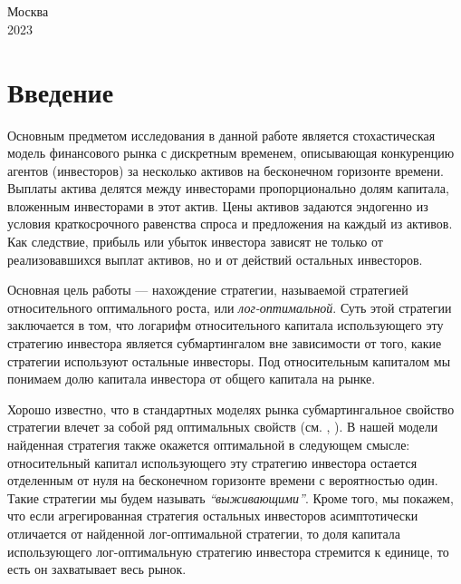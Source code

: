 \documentclass[a4paper,12pt,russian]{article} %
\theoremstyle{definition}
\begin{document}
    \hfill \break \\
    \hfill \\
    \hfill
    
\begin{center}
    Москва\\
    2023
\end{center}
    \thispagestyle{empty} %
    
    \tableofcontents
    
    \newpage
    
\section{Введение}
Основным предметом исследования в данной работе является стохастическая модель финансового рынка с дискретным временем, описывающая конкуренцию агентов (инвесторов) за несколько активов на бесконечном горизонте времени. Выплаты актива делятся между инвесторами пропорционально долям капитала, вложенным инвесторами в этот актив. Цены активов задаются эндогенно из условия краткосрочного равенства спроса и предложения на каждый из активов. Как следствие, прибыль или убыток инвестора зависят не только от реализовавшихся выплат активов, но и от действий остальных инвесторов.

Основная цель работы — нахождение стратегии, называемой стратегией относительного оптимального роста, или \textit{лог-оптимальной}. Суть этой стратегии заключается в том, что логарифм относительного капитала использующего эту стратегию инвестора является субмартингалом вне зависимости от того, какие стратегии используют остальные инвесторы. Под относительным капиталом мы понимаем долю капитала инвестора от общего капитала на рынке.

Хорошо известно, что в стандартных моделях рынка  субмартингальное свойство стратегии влечет за собой ряд оптимальных свойств (см. \cite{AlgoetCover1988}, \cite{KaratzasKardaras2007}). В нашей модели найденная стратегия также окажется оптимальной в следующем смысле: относительный капитал использующего эту стратегию инвестора остается отделенным от нуля на бесконечном горизонте времени с вероятностью один. Такие стратегии мы будем называть \textit{``выживающими''}. Кроме того, мы покажем, что если агрегированная стратегия остальных инвесторов асимптотически отличается от найденной лог-оптимальной стратегии, то доля капитала использующего лог-оптимальную стратегию инвестора стремится к единице, то есть он захватывает весь рынок.
\end{document}
